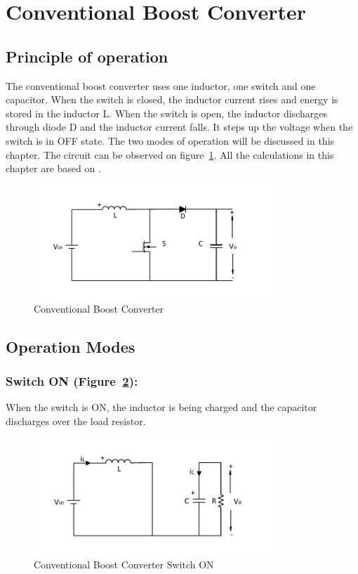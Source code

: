 \section{Conventional Boost Converter}\label{ch:CBC}
\subsection{Principle of operation}\label{sec:CBC_POC}

The conventional boost converter uses one inductor,
one switch and one capacitor. When the switch is closed, the inductor current rises and energy is stored in the inductor L. When the switch is open, the inductor discharges through diode D and the inductor current falls. It steps up the voltage when
the switch is in OFF state. The two modes of operation will be discussed in this chapter. The circuit can be observed on figure~\ref{fig:CBC}. All the calculations in this chapter are based on \cite{Hart2010}.

\begin{figure}[H]
   \centering
   \includegraphics[width=0.8\textwidth]{figures/aConventionalBoost/ConventionalBoostConverter.pdf}
    \caption{Conventional Boost Converter}
	\label{fig:CBC}
\end{figure}

\subsection{Operation Modes}\label{sec:CBC_OP}

\subsubsection{Switch ON (Figure~\ref{fig:CBC_ON}):}

When the switch is ON,
the inductor is being charged and the capacitor discharges over the load resistor.

\begin{figure}[H]
   \centering
   \includegraphics[width=0.8\textwidth]{figures/aConventionalBoost/ConventionalBoostConverterON.pdf}
    \caption{Conventional Boost Converter Switch ON}
	\label{fig:CBC_ON}
\end{figure}

